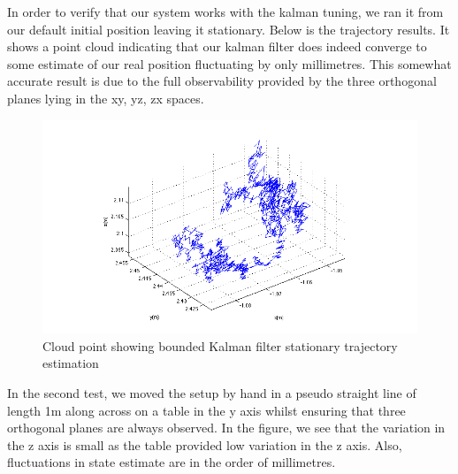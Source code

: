 \documentclass[]{article}
\begin{document}
{In order to verify that our system works with the kalman tuning, we ran it from our default initial position leaving it stationary. Below is the trajectory results. It shows a point cloud indicating that our kalman filter does indeed converge to some estimate of our real position fluctuating by only millimetres. This somewhat accurate result is due to the full observability provided by the three orthogonal planes lying in the xy, yz, zx spaces.


\begin{figure}[H]
	\begin{center}
		\includegraphics[width = \textwidth]{stationaryTraj.png}
	\end{center}
	\caption{Cloud point showing bounded Kalman filter stationary trajectory estimation}
	\label{fig:stationary_trajectory}
\end{figure}
In the second test, we moved the setup by hand in a pseudo straight line of length 1m along across on a table in the y axis whilst ensuring that three orthogonal planes are always observed. In the figure, we see that the variation in the z axis is small as the table provided low variation in the z axis. Also, fluctuations in state estimate are in the order of millimetres.

}
\end{document}
